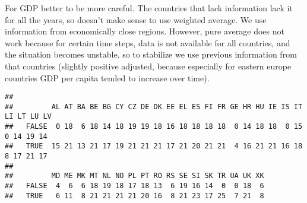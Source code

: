 \documentclass[
]{article}
\newenvironment{Shaded}{\begin{snugshade}}{\end{snugshade}}
\newcommand{\ControlFlowTok}[1]{\textcolor[rgb]{0.13,0.29,0.53}{\textbf{#1}}}
\newcommand{\DecValTok}[1]{\textcolor[rgb]{0.00,0.00,0.81}{#1}}
\newcommand{\KeywordTok}[1]{\textcolor[rgb]{0.13,0.29,0.53}{\textbf{#1}}}
\newcommand{\NormalTok}[1]{#1}
\newcommand{\OperatorTok}[1]{\textcolor[rgb]{0.81,0.36,0.00}{\textbf{#1}}}
\newcommand{\StringTok}[1]{\textcolor[rgb]{0.31,0.60,0.02}{#1}}
\begin{document}
\begin{Shaded}
\end{Shaded}

For GDP better to be more careful. The countries that lack information
lack it for all the years, so doesn't make sense to use weighted
average. We use information from economically close regions. However,
pure average does not work because for certain time steps, data is not
available for all countries, and the situation becomes unstable. so to
stabilize we use previous information from that countries (slightly
positive adjusted, because especially for eastern europe countries GDP
per capita tended to increase over time).

\begin{Shaded}
\end{Shaded}

\begin{verbatim}
##        
##         AL AT BA BE BG CY CZ DE DK EE EL ES FI FR GE HR HU IE IS IT LI LT LU LV
##   FALSE  0 18  6 18 14 18 19 19 18 16 18 18 18 18  0 14 18 18  0 15  0 14 19 14
##   TRUE  15 21 13 21 17 19 21 21 21 17 21 20 21 21  4 16 21 21 16 18  8 17 21 17
##        
##         MD ME MK MT NL NO PL PT RO RS SE SI SK TR UA UK XK
##   FALSE  4  6  6 18 19 18 17 18 13  6 19 16 14  0  0 18  6
##   TRUE   6 11  8 21 21 21 21 20 16  8 21 23 17 25  7 21  8
\end{verbatim}
\end{document}
